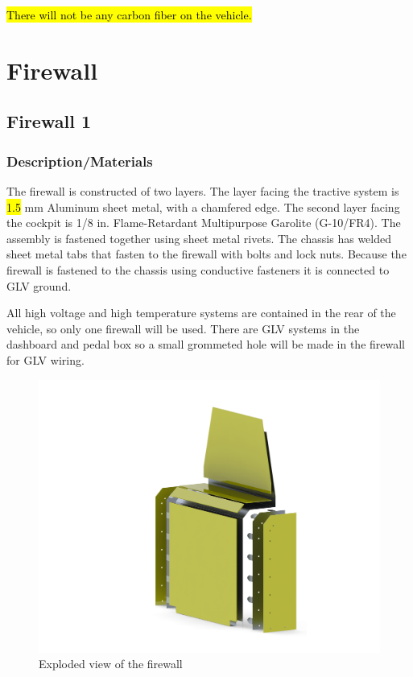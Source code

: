 \documentclass{article}
\DeclareRobustCommand{\hlr}[1]{{\sethlcolor{red}\hl{#1}}}
\begin{document}
        \hlr{There will not be any carbon fiber on the vehicle.}

\newpage

\section{Firewall}

    \subsection{Firewall 1}

        \subsubsection{Description/Materials}

            The firewall is constructed of two layers. The layer facing the tractive system is \hlr{1.5} mm Aluminum sheet metal, with a chamfered edge. The second layer facing the cockpit is 1/8 in. Flame-Retardant Multipurpose Garolite (G-10/FR4). The assembly is fastened together using sheet metal rivets. The chassis has welded sheet metal tabs that fasten to the firewall with bolts and lock nuts. Because the firewall is fastened to the chassis using conductive fasteners it is connected to GLV ground.

            All high voltage and high temperature systems are contained in the rear of the vehicle, so only one firewall will be used. There are GLV systems in the dashboard and pedal box so a small grommeted hole will be made in the firewall for GLV wiring.

            \begin{figure}[H]
                \centering
                \includegraphics[width = 0.6 \textwidth]{ExplodedView}
                \caption{Exploded view of the firewall}
                \label{explodedfirewall}
            \end{figure}
\end{document}
